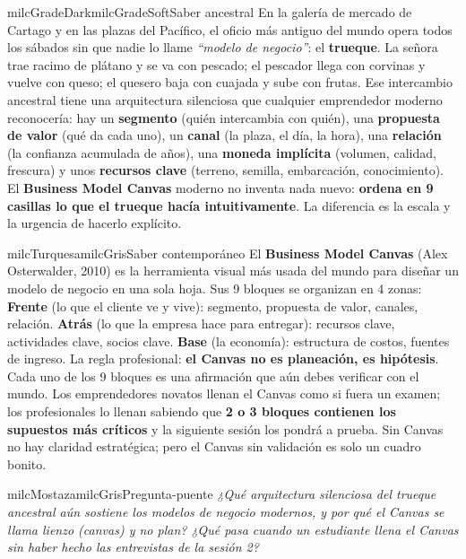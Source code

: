 \documentclass[11pt,letterpaper]{article}
\begin{document}
\begin{softbox}{milcGradeDark}{milcGradeSoft}{Saber ancestral}
En la galería de mercado de Cartago y en las plazas del Pacífico, el oficio más antiguo del mundo opera todos los sábados sin que nadie lo llame \emph{``modelo de negocio''}: el \textbf{trueque}. La señora trae racimo de plátano y se va con pescado; el pescador llega con corvinas y vuelve con queso; el quesero baja con cuajada y sube con frutas. Ese intercambio ancestral tiene una arquitectura silenciosa que cualquier emprendedor moderno reconocería: hay un \textbf{segmento} (quién intercambia con quién), una \textbf{propuesta de valor} (qué da cada uno), un \textbf{canal} (la plaza, el día, la hora), una \textbf{relación} (la confianza acumulada de años), una \textbf{moneda implícita} (volumen, calidad, frescura) y unos \textbf{recursos clave} (terreno, semilla, embarcación, conocimiento). El \textbf{Business Model Canvas} moderno no inventa nada nuevo: \textbf{ordena en 9 casillas lo que el trueque hacía intuitivamente}. La diferencia es la escala y la urgencia de hacerlo explícito.
\end{softbox}

\begin{softbox}{milcTurquesa}{milcGris}{Saber contemporáneo}
El \textbf{Business Model Canvas} (Alex Osterwalder, 2010) es la herramienta visual más usada del mundo para diseñar un modelo de negocio en una sola hoja. Sus 9 bloques se organizan en 4 zonas: \textbf{Frente} (lo que el cliente ve y vive): segmento, propuesta de valor, canales, relación. \textbf{Atrás} (lo que la empresa hace para entregar): recursos clave, actividades clave, socios clave. \textbf{Base} (la economía): estructura de costos, fuentes de ingreso. La regla profesional: \textbf{el Canvas no es planeación, es hipótesis}. Cada uno de los 9 bloques es una afirmación que aún debes verificar con el mundo. Los emprendedores novatos llenan el Canvas como si fuera un examen; los profesionales lo llenan sabiendo que \textbf{2 o 3 bloques contienen los supuestos más críticos} y la siguiente sesión los pondrá a prueba. Sin Canvas no hay claridad estratégica; pero el Canvas sin validación es solo un cuadro bonito.
\end{softbox}

\begin{softbox}{milcMostaza}{milcGris}{Pregunta-puente}
\textit{¿Qué arquitectura silenciosa del trueque ancestral aún sostiene los modelos de negocio modernos, y por qué el Canvas se llama \emph{lienzo} (canvas) y no \emph{plan}? ¿Qué pasa cuando un estudiante llena el Canvas sin haber hecho las entrevistas de la sesión 2?}
\end{softbox}
\end{document}

